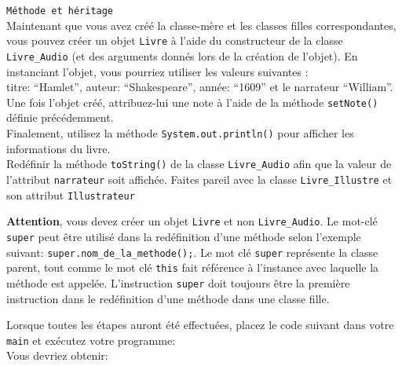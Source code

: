 \begin{Exercice}[10 minutes] \lstinline{Méthode et héritage} \\
Maintenant que vous avez créé la classe-mère et les classes filles correspondantes, vous pouvez créer un objet \lstinline{Livre} à l'aide du constructeur de la classe \lstinline{Livre_Audio} (et des arguments donnés lors de la création de l'objet).
En instanciant l'objet, vous pourriez utiliser les valeurs suivantes :\\
titre: ``Hamlet'', auteur: ``Shakespeare'', année: ``1609'' et le narrateur ``William''.\\
Une fois l'objet créé, attribuez-lui une note à l'aide de la méthode \lstinline{setNote()} définie précédemment.\\ 
Finalement, utilisez la méthode \lstinline{System.out.println()} pour afficher les informations du livre.\\
Redéfinir la méthode \lstinline{toString()} de la classe \lstinline{Livre_Audio} afin que la valeur de l'attribut \lstinline{narrateur} soit affichée.
Faites pareil avec la classe \lstinline{Livre_Illustre} et son attribut \lstinline{Illustrateur}
\begin{conseil}
\textbf{Attention}, vous devez créer un objet \lstinline{Livre} et non \lstinline{Livre_Audio}.
Le mot-clé \lstinline{super} peut être utilisé dans la redéfinition d'une méthode selon l'exemple suivant: \lstinline{super.nom_de_la_methode();}. Le mot clé \lstinline{super} représente la classe parent, tout comme le mot clé \lstinline{this} fait référence à l'instance avec laquelle la méthode est appelée. 
L'instruction \lstinline{super} doit toujours être la première instruction dans le redéfinition d'une méthode dans une classe fille. 
\end{conseil}
\begin{solution}
	
	
\end{solution}
\end{Exercice}
\newpage
Lorsque toutes les étapes auront été effectuées, placez le code suivant dans votre \lstinline{main} et exécutez votre programme:\\

Vous devriez obtenir:

\newpage

